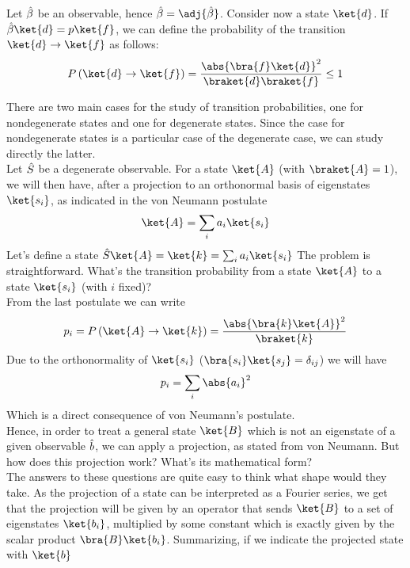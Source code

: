\documentclass[../qm.tex]{subfiles}
\begin{document}
	\begin{pos}
		Let $\hat{\beta}$ be an observable, hence $\opr{\beta}=\adj{\opr{\beta}}$. Consider now a state $\ket{d}$. If $\opr{\beta}\ket{d}=p\ket{f}$, we can define the probability of the transition $\ket{d}\to\ket{f}$ as follows:
		\begin{equation*}
			P\left( \ket{d}\to\ket{f} \right)=\frac{\abs{\bra{f}\ket{d}}^2}{\braket{d}\braket{f}}\le1
		\end{equation*}
	\end{pos}
	There are two main cases for the study of transition probabilities, one for nondegenerate states and one for degenerate states. Since the case for nondegenerate states is a particular case of the degenerate case, we can study directly the latter.\\
	Let $\hat{S}$ be a degenerate observable. For a state $\ket{A}$ (with $\braket{A}=1$), we will then have, after a projection to an orthonormal basis of eigenstates $\ket{s_i}$, as indicated in the von Neumann postulate
	\begin{equation*}
		\ket{A}=\sum_ia_i\ket{s_i}
	\end{equation*}
	Let's define a state $\opr{S}\ket{A}=\ket{k}=\sum_ia_i\ket{s_i}$
	The problem is straightforward. What's the transition probability from a state $\ket{A}$ to a state $\ket{s_i}$ (with $i$ fixed)?\\
	From the last postulate we can write
	\begin{equation*}
		p_i=P\left( \ket{A}\to\ket{k} \right)=\frac{\abs{\bra{k}\ket{A}}^2}{\braket{k}}
	\end{equation*}
	Due to the orthonormality of $\ket{s_i}$ ($\bra{s_i}\ket{s_j}=\delta_{ij}$) we will have
	\begin{equation*}
		p_i=\sum_i\abs{a_i}^2
	\end{equation*}
	Which is a direct consequence of von Neumann's postulate.\\
	Hence, in order to treat a general state $\ket{B}$ which is not an eigenstate of a given observable $\hat{b}$, we can apply a projection, as stated from von Neumann. But how does this projection work? What's its mathematical form?\\
	The answers to these questions are quite easy to think what shape would they take. As the projection of a state can be interpreted as a Fourier series, we get that the projection will be given by an operator that sends $\ket{B}$ to a set of eigenstates $\ket{b_i}$, multiplied by some constant which is exactly given by the scalar product $\bra{B}\ket{b_i}$. Summarizing, if we indicate the projected state with $\ket{b}$
\end{document}

